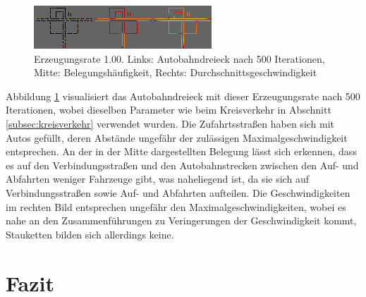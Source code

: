 \documentclass[10pt, a4paper]{article}
\newcommand\myref[1]{\ref{#1} (S. \pageref{#1})}
\newcommand\myrefcomma[1]{\ref{#1}, S. \pageref{#1}}
\begin{document}
\begin{figure}[h!]
	\centering
	\includegraphics[width=\textwidth]{img/interchangeTrumpet_100}
	\caption{Erzeugungsrate 1.00. Links: Autobahndreieck nach 500 Iterationen, Mitte: Belegungshäufigkeit, Rechts: Durchschnittsgeschwindigkeit}
	\label{fig:interchangeTrumpet100}
\end{figure}

Abbildung \ref{fig:interchangeTrumpet100} visualisiert das Autobahndreieck mit dieser Erzeugungsrate nach 500 Iterationen, wobei dieselben Parameter wie beim Kreisverkehr in Abschnitt \ref{subsec:kreisverkehr} verwendet wurden. Die Zufahrtsstraßen haben sich mit Autos gefüllt, deren Abstände ungefähr der zulässigen Maximalgeschwindigkeit entsprechen. An der in der Mitte dargestellten Belegung lässt sich erkennen, dass es auf den Verbindungsstraßen und den Autobahnstrecken zwischen den Auf- und Abfahrten weniger Fahrzeuge gibt, was naheliegend ist, da sie sich auf Verbindungsstraßen sowie Auf- und Abfahrten aufteilen. Die Geschwindigkeiten im rechten Bild entsprechen ungefähr den Maximalgeschwindigkeiten, wobei es nahe an den Zusammenführungen zu Veringerungen der Geschwindigkeit kommt, Stauketten bilden sich allerdings keine.

\newpage
\section{Fazit}
\label{sec:fazit}

\blindtext
\blindtext
\blindtext


{}

\end{document}
